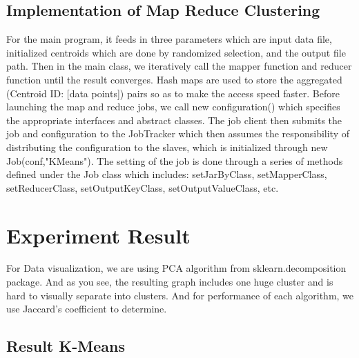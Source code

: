 \documentclass[fleqn]{llncs}
\begin{document}
\subsection{Implementation of Map Reduce Clustering}
For the main program, it feeds in three parameters which are input data file, initialized centroids which are done by randomized selection, and the output file path. Then in the main class, we iteratively call the mapper function and reducer function until the result converges. Hash maps are used to store the aggregated (Centroid ID: [data points]) pairs so as to make the access speed faster. Before launching the map and reduce jobs, we call new configuration() which specifies the appropriate interfaces and abstract classes. The job client then submits the job and configuration to the JobTracker which then assumes the responsibility of distributing the configuration to the slaves, which is initialized through new Job(conf,"KMeans"). The setting of the job is done through a series of methods defined under the Job class which includes: setJarByClass, setMapperClass, setReducerClass, setOutputKeyClass, setOutputValueClass, etc. 




\section{Experiment Result}


For Data visualization, we are using PCA algorithm from sklearn.decomposition package. And as you see, the resulting graph includes one huge cluster and is hard to visually separate into clusters. And for performance of each algorithm, we use Jaccard's coefficient to determine.

\subsection{Result K-Means}
\end{document}
